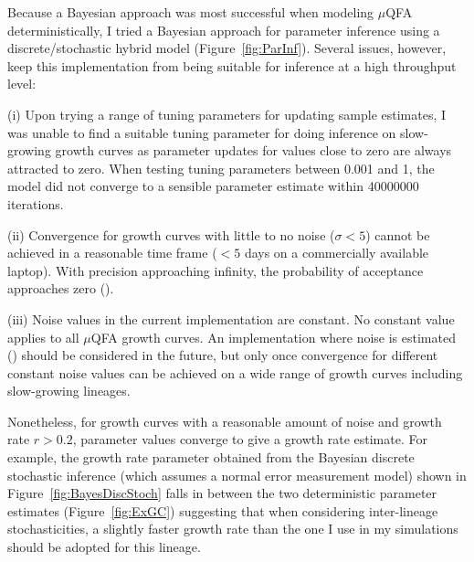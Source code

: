 \documentclass{bioinfo}
\begin{document}
{Because a Bayesian approach was most successful when modeling $\mu$QFA deterministically, I tried a Bayesian approach for parameter inference using a discrete/stochastic hybrid model (Figure~\ref{fig:ParInf}). Several issues, however, keep this implementation from being suitable for inference at a high throughput level: 

(i) Upon trying a range of tuning parameters for updating sample estimates, I was unable to find a suitable tuning parameter for doing inference on slow-growing growth curves as parameter updates for values close to zero are always attracted to zero. When testing tuning parameters between 0.001 and 1, the model did not converge to a sensible parameter estimate within 40000000 iterations.

(ii) Convergence for growth curves with little to no noise ($\sigma < 5$) cannot be achieved in a reasonable time frame ($<5$ days on a commercially available laptop). With precision approaching infinity, the probability of acceptance approaches zero (\citealp{Chen10}). 

(iii) Noise values in the current implementation are constant. No constant value applies to all $\mu$QFA growth curves. An implementation where noise is estimated (\citealp{Wilkinson06}) should be considered in the future, but only once convergence for different constant noise values can be achieved on a wide range of growth curves including slow-growing lineages.  

Nonetheless, for growth curves with a reasonable amount of noise and growth rate $r>0.2$, parameter values converge to give a growth rate estimate. For example, the growth rate parameter obtained from the Bayesian discrete stochastic inference (which assumes a normal error measurement model) shown in Figure~\ref{fig:BayesDiscStoch} falls in between the two deterministic parameter estimates (Figure~\ref{fig:ExGC}) suggesting that when considering inter-lineage stochasticities, a slightly faster growth rate than the one I use in my simulations should be adopted for this lineage. 

}
\end{document}
